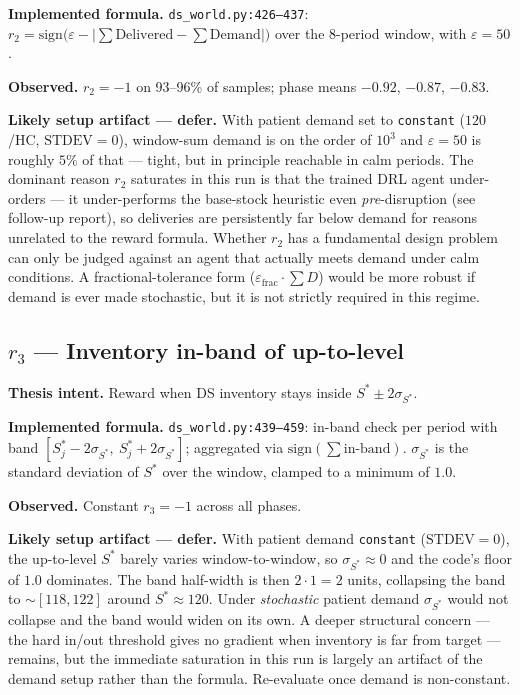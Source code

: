 \documentclass[11pt,letterpaper]{article}
\newcommand{\code}[1]{\texttt{\small #1}}
\begin{document}
\textbf{Implemented formula.}  \code{ds\_world.py:426--437}: $r_2 = \mathrm{sign}\bigl(\varepsilon - \lvert\sum \text{Delivered} - \sum \text{Demand}\rvert\bigr)$ over the 8-period window, with $\varepsilon = 50$.

\textbf{Observed.}  $r_2 = -1$ on 93--96\% of samples; phase means $-0.92$, $-0.87$, $-0.83$.

\textbf{Likely setup artifact --- defer.}  With patient demand set to \code{constant} ($120$/HC, $\text{STDEV}=0$), window-sum demand is on the order of $10^3$ and $\varepsilon = 50$ is roughly $5\%$ of that --- tight, but in principle reachable in calm periods.  The dominant reason $r_2$ saturates in this run is that the trained DRL agent under-orders --- it under-performs the base-stock heuristic even \emph{pre}-disruption (see follow-up report), so deliveries are persistently far below demand for reasons unrelated to the reward formula.  Whether $r_2$ has a fundamental design problem can only be judged against an agent that actually meets demand under calm conditions.  A fractional-tolerance form ($\varepsilon_{\text{frac}}\!\cdot\!\sum D$) would be more robust if demand is ever made stochastic, but it is not strictly required in this regime.

\subsection{$r_3$ --- Inventory in-band of up-to-level}

\textbf{Thesis intent.}  Reward when DS inventory stays inside $S^* \pm 2\sigma_{S^*}$.

\textbf{Implemented formula.}  \code{ds\_world.py:439--459}: in-band check per period with band $[S^*_j - 2\sigma_{S^*},\ S^*_j + 2\sigma_{S^*}]$; aggregated via $\mathrm{sign}(\sum \text{in-band})$. $\sigma_{S^*}$ is the standard deviation of $S^*$ over the window, clamped to a minimum of $1.0$.

\textbf{Observed.}  Constant $r_3 = -1$ across all phases.

\textbf{Likely setup artifact --- defer.}  With patient demand \code{constant} ($\text{STDEV}=0$), the up-to-level $S^*$ barely varies window-to-window, so $\sigma_{S^*} \approx 0$ and the code's floor of $1.0$ dominates.  The band half-width is then $2 \cdot 1 = 2$ units, collapsing the band to $\sim$$[118,122]$ around $S^* \approx 120$.  Under \emph{stochastic} patient demand $\sigma_{S^*}$ would not collapse and the band would widen on its own.  A deeper structural concern --- the hard in/out threshold gives no gradient when inventory is far from target --- remains, but the immediate saturation in this run is largely an artifact of the demand setup rather than the formula.  Re-evaluate once demand is non-constant.
\end{document}
